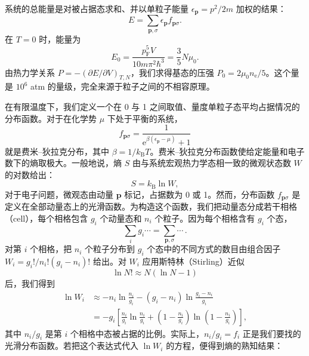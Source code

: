 系统的总能量是对被占据态求和、并以单粒子能量 $\epsilon_{\mathbf{p}}=p^{2}/2m$ 加权的结果：
\begin{equation*}
E=\sum_{\mathbf{p},\sigma}\epsilon_{\mathbf{p}}f_{\mathbf{p}\sigma}.
\tag{2.8}
\end{equation*}
在 $T=0$ 时，能量为
\begin{equation*}
E_{0}=\frac{p_{\mathrm{F}}^{5}V}{10m\pi^{2}\hbar^{3}}=\frac{3}{5}N\mu_{0}.
\tag{2.9}
\end{equation*}
由热力学关系 $P=-(\partial E/\partial V)_{T,N}$，我们求得基态的压强 $P_{0}=2\mu_{0}n_{\mathrm{e}}/5$。这个量是 $10^{6}$ atm 的量级，完全来源于粒子之间的不相容原理。

在有限温度下，我们定义一个在 0 与 1 之间取值、量度单粒子态平均占据情况的分布函数。对于在化学势 $\mu$ 下处于平衡的系统，
\begin{equation*}
f_{\mathbf{p}\sigma}=\frac{1}{\mathrm{e}^{\beta(\epsilon_{\mathbf{p}}-\mu)}+1}
\tag{2.10}
\end{equation*}
就是费米–狄拉克分布，其中 $\beta=1/k_{\mathrm{B}}T$。费米–狄拉克分布函数使给定能量和电子数下的熵取极大。一般地说，熵 $S$ 由与系统宏观热力学态相一致的微观状态数 $W$ 的对数给出：
\begin{equation*}
S=k_{\mathrm{B}}\ln W,
\tag{2.11}
\end{equation*}
对于电子问题，微观态由动量 $\mathbf{p}$ 标记，占据数为 0 或 1。然而，分布函数 $f_{\mathbf{p}\sigma}$ 是定义在全部动量态上的光滑函数。为构造这个函数，我们把动量态分成若干相格（cell），每个相格包含 $g_{i}$ 个动量态和 $n_{i}$ 个粒子。因为每个相格含有 $g_{i}$ 个态，
\begin{equation*}
\sum_{i}g_{i}\cdots=\sum_{\mathbf{p},\sigma}\cdots\,.
\tag{2.12}
\end{equation*}
对第 $i$ 个相格，把 $n_{i}$ 个粒子分布到 $g_{i}$ 个态中的不同方式的数目由组合因子 $W_{i}=g_{i}!/n_{i}!(g_{i}-n_{i})!$ 给出。对 $W_{i}$ 应用斯特林（Stirling）近似
\begin{equation*}
\ln N!\approx N(\ln N-1)
\tag{2.13}
\end{equation*}
后，我们得到
\begin{align*}
\ln W_{i}&\approx -n_{i}\ln\frac{n_{i}}{g_{i}}-(g_{i}-n_{i})\ln\frac{g_{i}-n_{i}}{g_{i}}
\tag{2.14}\\
&=-g_{i}\left[\frac{n_{i}}{g_{i}}\ln\frac{n_{i}}{g_{i}}+\left(1-\frac{n_{i}}{g_{i}}\right)\ln\left(1-\frac{n_{i}}{g_{i}}\right)\right],
\tag{2.15}
\end{align*}
其中 $n_{i}/g_{i}$ 是第 $i$ 个相格中态被占据的比例。实际上，$n_{i}/g_{i}=f_{i}$ 正是我们要找的光滑分布函数。若把这个表达式代入 $\ln W_{i}$ 的方程，便得到熵的熟知结果：
